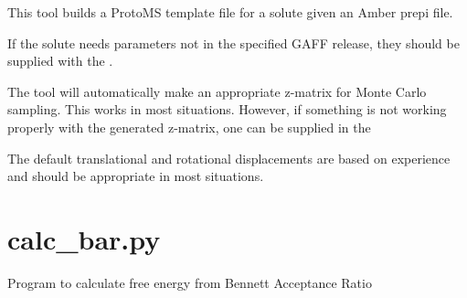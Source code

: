 \documentclass[letterpaper,10pt,english]{sphinxmanual}
\begin{document}

%
\begin{sphinxVerbatim}[commandchars=\\\{\}]
  
    
        
        
\end{sphinxVerbatim}


This tool builds a ProtoMS template file for a solute given an Amber prepi file.

If the solute needs parameters not in the specified GAFF release, they should be supplied with the .

The tool will automatically make an appropriate z-matrix for Monte Carlo sampling. This works in most situations. However, if something is not working properly with the generated z-matrix, one can be supplied in the 

The default translational and rotational displacements are based on experience and should be appropriate in most situations.


\section{calc\_bar.py}
\label{\detokenize{tools:calc-bar-py}}

Program to calculate free energy from Bennett Acceptance Ratio


%
\begin{sphinxVerbatim}[commandchars=\\\{\}]
  \PYG{p}{[}\PYG{p}{]} \PYG{p}{[} \PYG{p}{]} \PYG{p}{[} \PYG{p}{]} \PYG{p}{[} \PYG{p}{]} \PYG{p}{[} \PYG{p}{]}
                   \PYG{p}{[} \PYG{p}{]} \PYG{p}{[}\PYG{p}{]} \PYG{p}{[}\PYG{p}{]} \PYG{p}{[}\PYG{p}{]} \PYG{p}{[} \PYG{p}{]}
\end{sphinxVerbatim}
\end{document}
